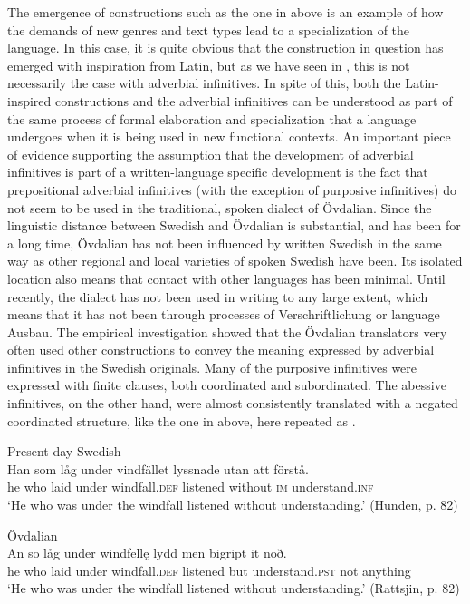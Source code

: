 \documentclass[output=paper]{langscibook}
\begin{document}
The emergence of constructions such as the one in  above is an example of how the demands of new genres and text types lead to a specialization of the language. In this case, it is quite obvious that the construction in question has emerged with inspiration from Latin, but as we have seen in , this is not necessarily the case with adverbial infinitives. In spite of this, both the Latin-inspired constructions and the adverbial infinitives can be understood as part of the same process of formal elaboration and specialization that a language undergoes when it is being used in new functional contexts. An important piece of evidence supporting the assumption that the development of adverbial infinitives is part of a written-language specific development is the fact that prepositional adverbial infinitives (with the exception of purposive infinitives) do not seem to be used in the traditional, spoken dialect of Övdalian. Since the linguistic distance between Swedish and Övdalian is substantial, and has been for a long time, Övdalian has not been influenced by written Swedish in the same way as other regional and local varieties of spoken Swedish have been. Its isolated location also means that contact with other languages has been minimal. Until recently, the dialect has not been used in writing to any large extent, which means that it has not been through processes of Verschriftlichung or language Ausbau. The empirical investigation showed that the Övdalian translators very often used other constructions to convey the meaning expressed by adverbial infinitives in the Swedish originals. Many of the purposive infinitives were expressed with finite clauses, both coordinated and subordinated. The abessive infinitives, on the other hand, were almost consistently translated with a negated coordinated structure, like the one in  above, here repeated as .


\ea
\label{ex:kalm:35}
\ea Present-day Swedish \\
\gll Han som låg under vindfället lyssnade utan att förstå.\\
 he who laid under windfall.\textsc{def} listened without \textsc{im} understand.\textsc{inf}\\
\glt ‘He who was under the windfall listened without understanding.’ (Hunden, p. 82)

\ex Övdalian\\
\gll An so låg under windfellę lydd men bigript it noð.\\
he who laid under windfall.\textsc{def} listened but understand.\textsc{pst} not anything\\
\glt ‘He who was under the windfall listened without understanding.’ (Rattsjin, p. 82)
\z
\z
\end{document}
